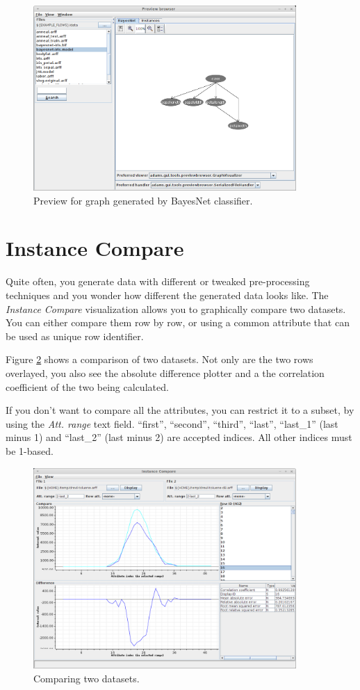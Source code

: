 \begin{figure}[htb]
  \centering
  \includegraphics[width=10.0cm]{images/previewbrowser-graph.png}
  \caption{Preview for graph generated by BayesNet classifier.}
  \label{previewbrowser-graph}
\end{figure}


\clearpage
\section{Instance Compare}
Quite often, you generate data with different or tweaked pre-processing 
techniques and you wonder how different the generated data looks like.
The \textit{Instance Compare} visualization allows you to graphically compare
two datasets. You can either compare them row by row, or using a common 
attribute that can be used as unique row identifier.

Figure \ref{instance-compare} shows a comparison of two datasets. Not only
are the two rows overlayed, you also see the absolute difference plotter and
a the correlation coefficient of the two being calculated.

If you don't want to compare all the attributes, you can restrict it to a 
subset, by using the \textit{Att. range} text field. ``first'', ``second'',
``third'', ``last'', ``last\_1'' (last minus 1) and ``last\_2'' (last minus 2)
are accepted indices. All other indices must be 1-based.

\begin{figure}[htb]
  \centering
  \includegraphics[width=10.0cm]{images/instance-compare.png}
  \caption{Comparing two datasets.}
  \label{instance-compare}
\end{figure}


